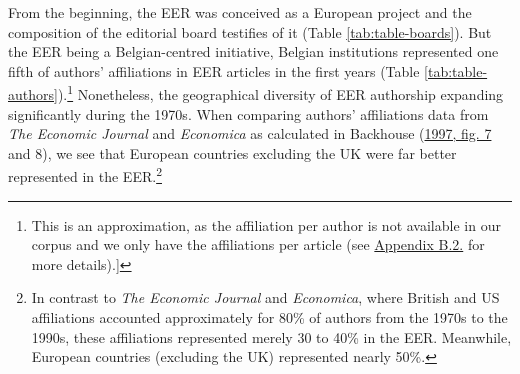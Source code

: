 \documentclass[
  12pt,
  onecolumn]{article}
\begin{document}
From the beginning, the EER was conceived as a European project and the
composition of the editorial board testifies of it (Table
\ref{tab:table-boards}). But the EER being a Belgian-centred initiative,
Belgian institutions represented one fifth of authors' affiliations in
EER articles in the first years (Table
\ref{tab:table-authors}).\footnote{This is an approximation, as the
  affiliation per author is not available in our corpus and we only have
  the affiliations per article (see
  \protect\hyperlink{author-affiliation}{Appendix B.2.} for more
  details).{]}} Nonetheless, the geographical diversity of EER
authorship expanding significantly during the 1970s. When comparing
authors' affiliations data from \emph{The Economic Journal} and
\emph{Economica} as calculated in Backhouse
(\protect\hyperlink{ref-backhouse1997a}{1997, fig. 7} and 8), we see
that European countries excluding the UK were far better represented in
the EER.\footnote{In contrast to \emph{The Economic Journal} and
  \emph{Economica}, where British and US affiliations accounted
  approximately for 80\% of authors from the 1970s to the 1990s, these
  affiliations represented merely 30 to 40\% in the EER. Meanwhile,
  European countries (excluding the UK) represented nearly 50\%.}

\begingroup\fontsize{3}{5}\selectfont
\end{document}
